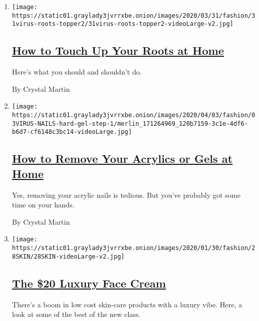 \begin{enumerate}
\def\labelenumi{\arabic{enumi}.}
\item
  \texttt{[image: https://static01.graylady3jvrrxbe.onion/images/2020/03/31/fashion/31virus-roots-topper2/31virus-roots-topper2-videoLarge-v2.jpg]}

  \hypertarget{how-to-touch-up-your-roots-at-home}{%
  \subsection{\texorpdfstring{\href{/2020/03/31/style/how-to-touch-up-your-roots-at-home.html}{How
  to Touch Up Your Roots at
  Home}}{How to Touch Up Your Roots at Home}}\label{how-to-touch-up-your-roots-at-home}}

  Here's what you should and shouldn't do.

  By Crystal Martin
\item
  \texttt{[image: https://static01.graylady3jvrrxbe.onion/images/2020/04/03/fashion/03VIRUS-NAILS-hard-gel-step-1/merlin\_171264969\_120b7159-3c1e-4df6-b6d7-cf6148c3bc14-videoLarge.jpg]}

  \hypertarget{how-to-remove-your-acrylics-or-gels-at-home}{%
  \subsection{\texorpdfstring{\href{/2020/04/03/style/how-to-remove-your-acrylics-or-gels-at-home.html}{How
  to Remove Your Acrylics or Gels at
  Home}}{How to Remove Your Acrylics or Gels at Home}}\label{how-to-remove-your-acrylics-or-gels-at-home}}

  Yes, removing your acrylic nails is tedious. But you've probably got
  some time on your hands.

  By Crystal Martin
\item
  \texttt{[image: https://static01.graylady3jvrrxbe.onion/images/2020/01/30/fashion/28SKIN/28SKIN-videoLarge-v2.jpg]}

  \hypertarget{the-20-luxury-face-cream}{%
  \subsection{\texorpdfstring{\href{/2020/01/29/style/skin-care-beauty-the-20-luxury-face-cream.html}{The
  \$20 Luxury Face
  Cream}}{The \$20 Luxury Face Cream}}\label{the-20-luxury-face-cream}}

  There's a boom in low cost skin-care products with a luxury vibe.
  Here, a look at some of the best of the new class.


\end{enumerate}
